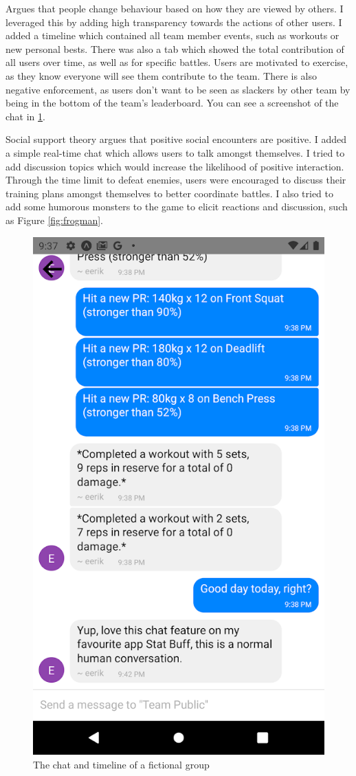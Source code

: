 \documentclass{l4proj}
\begin{document}
Argues that people change behaviour based on how they are viewed by others. I leveraged this by adding high transparency towards the actions of other users. I added a timeline which contained all team member events, such as workouts or new personal bests. There was also a tab which showed the total contribution of all users over time, as well as for specific battles. Users are motivated to exercise, as they know everyone will see them contribute to the team. There is also negative enforcement, as users don't want to be seen as slackers by other team by being in the bottom of the team's leaderboard. You can see a screenshot of the chat in \ref{fig:chat}.

Social support theory argues that positive social encounters are positive. I added a simple real-time chat which allows users to talk amongst themselves. I tried to add discussion topics which would increase the likelihood of positive interaction. Through the time limit to defeat enemies, users were encouraged to discuss their training plans amongst themselves to better coordinate battles. I also tried to add some humorous monsters to the game to elicit reactions and discussion, such as Figure \ref{fig:frogman}. 

\begin{figure}[H]
    \centering
    \includegraphics[width=0.4\linewidth]{chat.png}    
    \caption{The chat and timeline of a fictional group}
    \label{fig:chat}
\end{figure}
\end{document}
